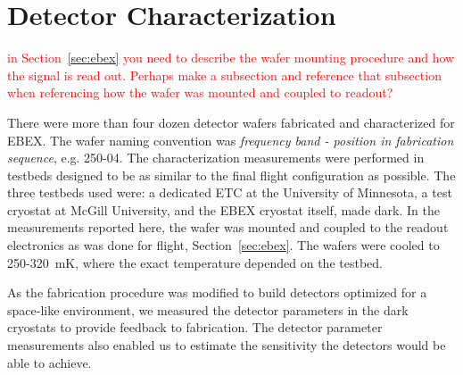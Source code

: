 \chapter{Detector Characterization}
\label{sec:detector_characterization}


\textcolor{red}{in Section~\ref{sec:ebex} you need to describe the wafer mounting procedure and how the signal is read out. Perhaps make a subsection and reference that subsection when referencing how the wafer was mounted and coupled to readout?}

There were more than four dozen detector wafers fabricated and characterized for \ac{EBEX}. 
The wafer naming convention was \textit{frequency band - position in fabrication sequence}, e.g. 250-04.
The characterization measurements were performed in testbeds designed to be as similar to the final flight configuration as possible. 
The three testbeds used were: 
a dedicated \ac{ETC}  at the University of Minnesota, %
a test cryostat at McGill University, and the \ac{EBEX} cryostat itself, made dark. 
In the measurements reported here, the wafer was mounted and coupled to the readout electronics as was done for flight, Section~\ref{sec:ebex}. 
The wafers were cooled to 250-320~mK, where the exact temperature depended on the testbed. 

As the fabrication procedure was modified to build detectors optimized for a space-like environment, we measured the detector parameters in the dark cryostats to provide feedback to fabrication. 
The detector parameter measurements also enabled us to estimate the sensitivity the detectors would be able to achieve. 

